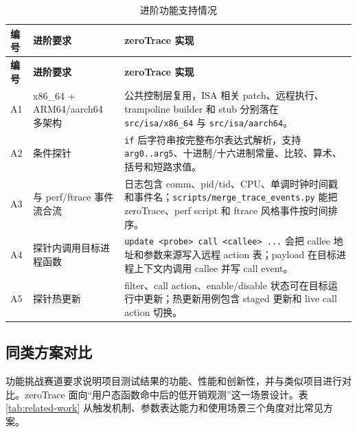\documentclass[UTF8,a4paper,11pt,fontset=fandol]{ctexart}
\newcommand{\code}[1]{\texttt{#1}}
\begin{document}
\begin{longtable}{@{}P{1.0cm}P{4.2cm}P{9.95cm}@{}}
\caption{进阶功能支持情况}\label{tab:advanced-req}\\
\toprule
\textbf{编号} & \textbf{进阶要求} & \textbf{zeroTrace 实现}\\
\midrule
\endfirsthead
\toprule
\textbf{编号} & \textbf{进阶要求} & \textbf{zeroTrace 实现}\\
\midrule
\endhead
A1 & x86\_64 + ARM64/aarch64 多架构 &
公共控制层复用，ISA 相关 patch、远程执行、trampoline builder 和 stub 分别落在 \code{src/isa/x86\_64} 与 \code{src/isa/aarch64}。\\
A2 & 条件探针 &
\code{if} 后字符串按完整布尔表达式解析，支持 \code{arg0..arg5}、十进制/十六进制常量、比较、算术、括号和短路求值。\\
A3 & 与 perf/ftrace 事件流合流 &
日志包含 comm、pid/tid、CPU、单调时钟时间戳和事件名；\code{scripts/merge\_trace\_events.py} 能把 zeroTrace、perf script 和 ftrace 风格事件按时间排序。\\
A4 & 探针内调用目标进程函数 &
\code{update <probe> call <callee> ...} 会把 callee 地址和参数来源写入远程 action 表；payload 在目标进程上下文内调用 callee 并写 call event。\\
A5 & 探针热更新 &
filter、call action、enable/disable 状态可在目标运行中更新；热更新用例包含 staged 更新和 live call action 切换。\\
\bottomrule
\end{longtable}

\subsection{同类方案对比}

功能挑战赛道要求说明项目测试结果的功能、性能和创新性，并与类似项目进行对比。zeroTrace 面向“用户态函数命中后的低开销观测”这一场景设计。表 \ref{tab:related-work} 从触发机制、参数表达能力和使用场景三个角度对比常见方案。
\end{document}
